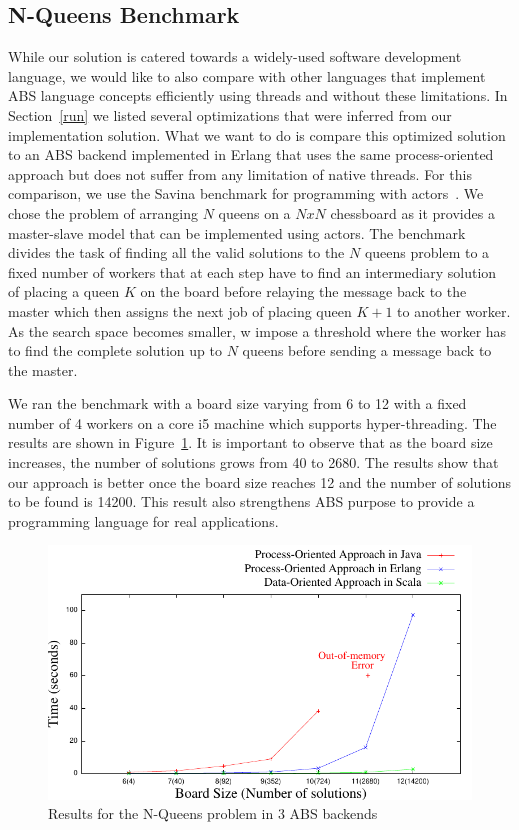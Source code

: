 \subsection{N-Queens Benchmark}
\label{bench2}
\par While our solution is catered towards a widely-used software development language, we would like to also compare with other languages that implement ABS language concepts efficiently using threads and without these limitations. In Section~\ref{run} we listed several optimizations that were inferred from our implementation solution. What we want to do is compare this optimized solution to an ABS backend implemented in Erlang that uses the same process-oriented approach but does not suffer from any limitation of native threads. For this comparison, we use the Savina benchmark for programming with actors~\cite{savina}.  We chose the problem of arranging $N$ queens on a $NxN$ chessboard as it provides a master-slave model that can be implemented using actors.  The benchmark divides the task of finding all the valid solutions to the $N$ queens problem to a fixed number of workers that at each step have to find an intermediary solution of placing a queen $K$ on the board before relaying the message back to the master which then assigns the next job of placing queen $K+1$ to another worker. As the search space becomes smaller, w impose a threshold where the worker has to find the complete solution up to $N$ queens before sending a message back to the master. 
\par We ran the benchmark with a board size varying from 6 to 12 with a fixed number of 4 workers on a core i5 machine which supports hyper-threading. The results are shown in Figure~\ref{ej}. It is important to observe that as the board size increases, the number of solutions grows from 40 to 2680. The results show that our approach is better once the board size reaches 12 and the number of solutions to be found is 14200. This result also strengthens ABS purpose to provide a programming language for real applications.

\begin{figure}
	\centering
	\includegraphics[scale=.7]{erlj8.pdf}
	\caption{Results for the N-Queens problem in 3 ABS backends}
	\label{ej}
\end{figure}

